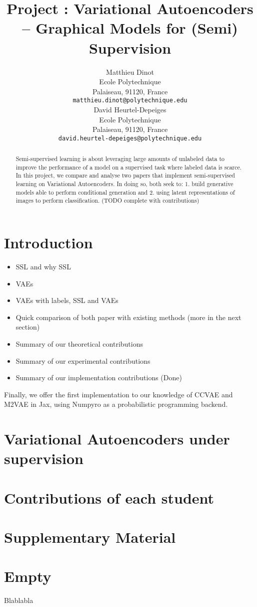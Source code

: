 \documentclass{article}
\title{Project : Variational Autoencoders – Graphical Models for (Semi) Supervision}
\author{%
  Matthieu Dinot \\
  Ecole Polytechnique\\
  Palaiseau, 91120, France \\
    \texttt{matthieu.dinot@polytechnique.edu} \\
\AND
 David Heurtel-Depeiges \\
  Ecole Polytechnique\\
  Palaiseau, 91120, France \\
    \texttt{david.heurtel-depeiges@polytechnique.edu} \\
}
\begin{document}
\maketitle


\begin{abstract}
  Semi-supervised learning is about leveraging large amounts of unlabeled data to improve the performance of a model on a supervised task where labeled data is scarce. In this project, we compare and analyse two papers that implement semi-supervised learning on Variational Autoencoders. In doing so, both seek to: 1. build generative models able to perform conditional generation and 2. using latent representations of images to perform classification. (TODO complete with contributions)
\end{abstract}


\section{Introduction}



\begin{itemize}
    \item SSL and why SSL
    \item VAEs
    \item VAEs with labels, SSL and VAEs
    \item Quick comparison of both paper with existing methods (more in the next section)
    \item Summary of our theoretical contributions
    \item Summary of our experimental contributions
    \item Summary of our implementation contributions (Done)
\end{itemize}

Finally, we offer the first implementation to our knowledge of CCVAE and M2VAE in Jax, using Numpyro as a probabilistic programming backend.

\section{Variational Autoencoders under supervision}


\section{Contributions of each student}



\section{Supplementary Material}





\newpage
\appendix
\section{Empty}
Blablabla
\end{document}
